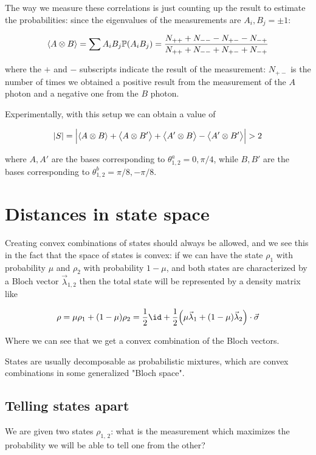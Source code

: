 \documentclass[main.tex]{subfiles}
\begin{document}
The way we measure these correlations is just counting up the result to estimate the probabilities: since the eigenvalues of the measurements are \(A_i, B_j = \pm 1\):

\begin{equation}
    \expval{A \otimes B}
    = \sum  A_i B_j \P(A_i B_j)
    = \frac{N_{++} + N_{--} - N_{+-} - N_{-+}}{N_{++} + N_{--} + N_{+-} + N_{-+}}
\end{equation}

where the \(+\) and \(-\) subscripts indicate the result of the measurement: \(N_{+-}\) is the number of times we obtained a positive result from the measurement of the \(A\) photon and a negative one from the \(B\) photon.

Experimentally, with this setup we can obtain a value of

\begin{equation}
    \abs{S} =\abs{
     \expval{A \otimes B} +
     \expval{A \otimes B'} +
     \expval{A' \otimes B} -
     \expval{A' \otimes B'}}
     > 2
\end{equation}

where \(A, A'\) are the bases corresponding to \( \theta^a_{1, 2} = 0, \pi/4\), while
\(B, B'\) are the bases corresponding to \( \theta^b_{1, 2} = \pi/8, -\pi/8\).

\section{Distances in state space}

Creating convex combinations of states should always be allowed,  and we see this in the fact that the space of states is convex: if we can have the state \(\rho_1\) with probability \(\mu\) and \(\rho_2\) with probability \(1-\mu\), and both states are characterized by a Bloch vector \(\vec{\lambda}_{1,2} \) then the total state will be represented by a density matrix like

\begin{equation}
    \rho = \mu \rho_1 + (1 - \mu) \rho_2
    = \frac{1}{2} \id + \frac{1}{2} \qty(\mu \vec{\lambda}_1 + (1- \mu)\vec{\lambda}_2) \cdot \vec{\sigma}
\end{equation}

Where we can see that we get a convex combination of the Bloch vectors.

States are usually decomposable as probabilistic mixtures, which are convex combinations in some generalized "Bloch space".

\subsection{Telling states apart} We are given two states \(\rho _{1, \, 2}\): what is the measurement which maximizes the probability we will be able to tell one from the other?
\end{document}
